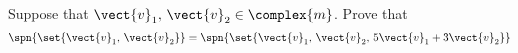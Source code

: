 Suppose that $\vect{v}_1,\,\vect{v}_2\in\complex{m}$.  Prove that 
%
\begin{equation*}
\spn{\set{\vect{v}_1,\,\vect{v}_2}}=
\spn{\set{\vect{v}_1,\,\vect{v}_2,\,5\vect{v}_1+3\vect{v}_2}}
\end{equation*}
%